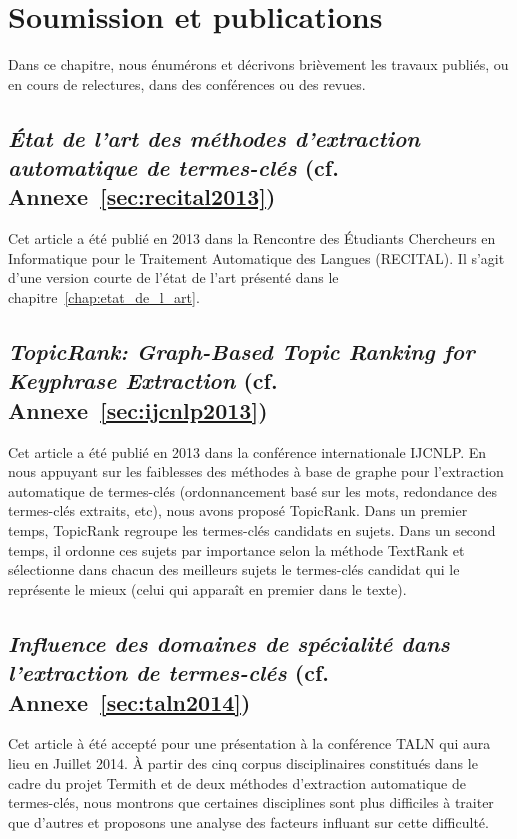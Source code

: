 \chapter{Soumission et publications}
  Dans ce chapitre, nous énumérons et décrivons brièvement les travaux
  publiés, ou en cours de relectures, dans des conférences ou des revues.

  \section{\textit{État de l'art des méthodes d'extraction automatique de
           termes-clés} (cf. Annexe~\ref{sec:recital2013})}
    Cet article a été publié en 2013 dans la Rencontre des Étudiants Chercheurs
    en Informatique pour le Traitement Automatique des Langues (RECITAL). Il
    s'agit d'une version courte de l'état de l'art présenté dans le
    chapitre~\ref{chap:etat_de_l_art}.

  \section{\textit{TopicRank: Graph-Based Topic Ranking for Keyphrase
           Extraction} (cf. Annexe~\ref{sec:ijcnlp2013})}
  \label{sec:resume_ijcnlp2013}
    Cet article a été publié en 2013 dans la conférence internationale IJCNLP.
    En nous appuyant sur les faiblesses des méthodes à base de graphe pour
    l'extraction automatique de termes-clés (ordonnancement basé sur les mots,
    redondance des termes-clés extraits, etc), nous avons proposé TopicRank.
    Dans un premier temps, TopicRank regroupe les termes-clés candidats en
    sujets. Dans un second temps, il ordonne ces sujets par importance selon la
    méthode TextRank et sélectionne dans chacun des meilleurs sujets le
    termes-clés candidat qui le représente le mieux (celui qui apparaît en
    premier dans le texte).

  \section{\textit{Influence des domaines de spécialité dans l'extraction de
           termes-clés} (cf. Annexe~\ref{sec:taln2014})}
    Cet article à été accepté pour une présentation à la conférence TALN qui
    aura lieu en Juillet 2014. À partir des cinq corpus disciplinaires
    constitués dans le cadre du projet Termith et de deux méthodes d'extraction
    automatique de termes-clés, nous montrons que certaines disciplines sont
    plus difficiles à traiter que d'autres et proposons une analyse des facteurs
    influant sur cette difficulté.

